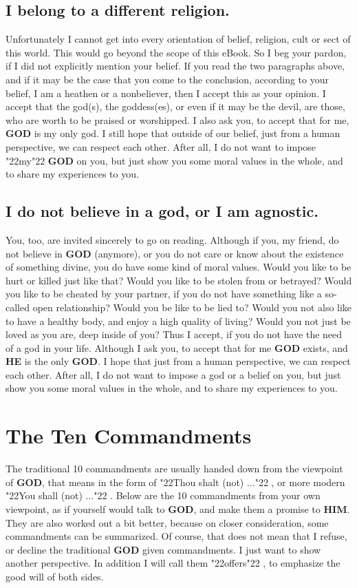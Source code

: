 \documentclass[12pt,a4paper]{article}
\newcommand{\God}[0]{\textbf{GOD}}
\newcommand{\He}[0]{\textbf{HE}}
\newcommand{\Him}[0]{\textbf{HIM}}
\newcommand{\q}[1]{\char"22{#1}\char"22 }
\begin{document}
	\subsection{I belong to a different religion.}
		Unfortunately I cannot get into every orientation of belief,
		religion, cult or sect of this world.
		This would go beyond the scope of this eBook.
		So I beg your pardon,
		if I did not explicitly mention your belief.
		If you read the two paragraphs above,
		and if it may be the case that you come to the conclusion,
		according to your belief,
		I am a heathen or a nonbeliever,
		then I accept this as your opinion.
		I accept that the god(s),
		the goddess(es),
		or even if it may be the devil,
		are those,
		who are worth to be praised or worshipped.
		I also ask you,
		to accept that for me,
		{\God} is my only god.
		I still hope that outside of our belief,
		just from a human perspective,
		we can respect each other.
		After all,
		I do not want to impose \q{my} {\God} on you,
		but just show you some moral values in the whole,
		and to share my experiences to you.
		
	\subsection{I do not believe in a god, or I am agnostic.}
		You,
		too,
		are invited sincerely to go on reading.
		Although if you,
		my friend,
		do not believe in {\God} (anymore),
		or you do not care or know about the existence of something divine,
		you do have some kind of moral values.
		Would you like to be hurt or killed just like that?
		Would you like to be stolen from or betrayed?
		Would you like to be cheated by your partner,
		if you do not have something like a so-called open relationship?
		Would you be like to be lied to?
		Would you not also like to have a healthy body,
		and enjoy a high quality of living?
		Would you not just be loved as you are,
		deep inside of you?
		Thus I accept,
		if you do not have the need of a god in your life.
		Although I ask you,
		to accept that for me {\God} exists,
		and {\He} is the only {\God}.
		I hope that just from a human perspective,
		we can respect each other.
		After all,
		I do not want to impose a god or a belief on you,
		but just show you some moral values in the whole,
		and to share my experiences to you.

	\newpage
	\section{The Ten Commandments}
		The traditional 10 commandments are usually handed down from the viewpoint of {\God},
		that means in the form of \q{Thou shalt (not) ...},
		or more modern \q{You shall (not) ...}.
		Below are the 10 commandments from your own viewpoint,
		as if yourself would talk to {\God},
		and make them a promise to {\Him}.
		They are also worked out a bit better,
		because on closer consideration,
		some commandments can be summarized.
		Of course,
		that does not mean that I refuse,
		or decline the traditional {\God} given commandments.
		I just want to show another perspective.
		In addition I will call them \q{offers},
		to emphasize the good will of both sides.
	
\end{document}
